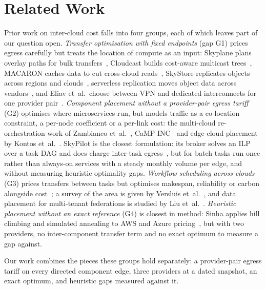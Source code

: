 \documentclass[conference]{IEEEtran}
\begin{document}
\section{Related Work}
Prior work on inter-cloud cost falls into four groups, each of which leaves part of our question open.
\emph{Transfer optimisation with fixed endpoints} (gap G1) prices egress carefully but treats the
location of compute as an input: Skyplane plans overlay paths for bulk transfers~\cite{jain2023skyplane},
Cloudcast builds cost-aware multicast trees~\cite{wooders2024cloudcast}, MACARON caches data to cut
cross-cloud reads~\cite{park2024reducing}, SkyStore replicates objects across regions and
clouds~\cite{liu2025skystore}, serverless replication moves object data across
vendors~\cite{shu2026serverless}, and Eliav et~al.\ choose between VPN and dedicated interconnects for
one provider pair~\cite{eliav2026understanding}.
\emph{Component placement without a provider-pair egress tariff} (G2) optimises where microservices run,
but models traffic as a co-location constraint, a per-node coefficient or a per-link cost:
the multi-cloud re-orchestration work of Zambianco et~al.~\cite{zambianco2024cost,zambianco2025disruptionaware},
CaMP-INC~\cite{ali2022campinc} and edge-cloud placement by Kontos et~al.~\cite{kontos2023cloudnative}.
SkyPilot is the closest formulation: its broker solves an ILP over a task DAG and does charge inter-task
egress~\cite{yang2023skypilot}, but for batch tasks run once rather than always-on services with a steady
monthly volume per edge, and without measuring heuristic optimality gaps.
\emph{Workflow scheduling across clouds} (G3) prices transfers between tasks but optimises makespan,
reliability or carbon alongside cost~\cite{tekawade2023cost,christofidi2026huntms}; a survey of the area
is given by Versluis et~al.~\cite{versluis2021a}, and data placement for multi-tenant federations is
studied by Liu et~al.~\cite{liu2021data}.
\emph{Heuristic placement without an exact reference} (G4) is closest in method: Sinha applies hill
climbing and simulated annealing to AWS and Azure pricing~\cite{sinha2023optimization}, but with two
providers, no inter-component transfer term and no exact optimum to measure a gap against.

Our work combines the pieces these groups hold separately: a provider-pair egress tariff on every
directed component edge, three providers at a dated snapshot, an exact optimum, and heuristic gaps
measured against it.
\end{document}
